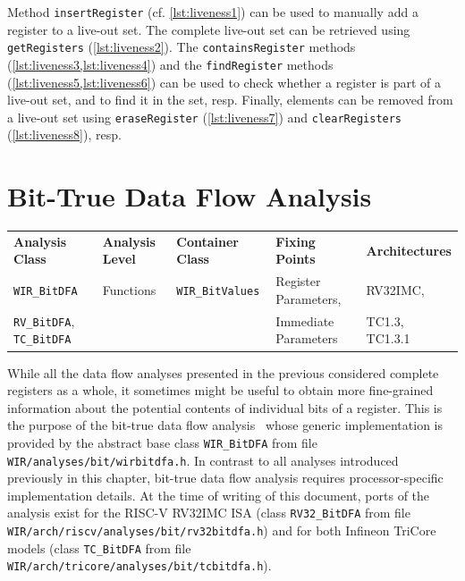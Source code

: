 Method \texttt{insertRegister} (cf. \cref{lst:liveness1}) can be used to manually add a register to a live-out set.
The complete live-out set can be retrieved using \texttt{getRegisters} (\cref{lst:liveness2}).
The \texttt{containsRegister} methods (\cref{lst:liveness3,lst:liveness4}) and the \texttt{findRegister} methods (\cref{lst:liveness5,lst:liveness6}) can be used to check whether a register is part of a live-out set, and to find it in the set, resp.
Finally, elements can be removed from a live-out set using \texttt{eraseRegister} (\cref{lst:liveness7}) and \texttt{clearRegisters} (\cref{lst:liveness8}), resp.


\section{Bit-True Data Flow Analysis}
\label{sec:bitdflow}

\begin{tabular}{|l|l|l|l|l|}
  \hline
  \textbf{Analysis Class} & \textbf{Analysis Level} & \textbf{Container Class} & \textbf{Fixing Points} & \textbf{Architectures} \\
  \hhline{|=|=|=|=|=|}
  \texttt{\small WIR\_BitDFA} & Functions & \texttt{\small WIR\_BitValues} & Register Parameters, & RV32IMC, \\
  \texttt{\small RV\_BitDFA}, \texttt{\small TC\_BitDFA} &           &                                & Immediate Parameters & TC1.3, TC1.3.1 \\
  \hline
\end{tabular}

While all the data flow analyses presented in the previous  considered complete registers as a whole, it sometimes might be useful to obtain more fine-grained information about the potential contents of individual bits of a register.
This is the purpose of the bit-true data flow analysis~\cite{Wag06} whose generic implementation is provided by the abstract base class \texttt{WIR\_BitDFA} from file \texttt{WIR/analyses/bit/wirbitdfa.h}.
In contrast to all analyses introduced previously in this chapter, bit-true data flow analysis requires processor-specific implementation details.
At the time of writing of this document, ports of the analysis exist for the RISC-V RV32IMC \gls{ISA} (class \texttt{RV32\_BitDFA} from file \texttt{WIR/arch/riscv/analyses/bit/rv32bitdfa.h}) and for both Infineon TriCore models (class \texttt{TC\_BitDFA} from file \texttt{WIR/arch/tricore/analyses/bit/tcbitdfa.h}).

